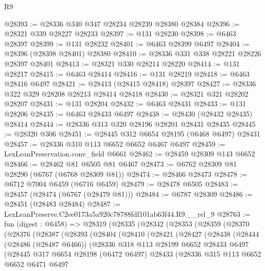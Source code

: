 \begin{lexlean}{R9}
\begin{coremodule}
@28393 := @28336 @340 @347 @28234 @28239 @28380 @28384
@28396 := @28321 @339 @28227 @28233
@28397 := @131 @28230
@28398 := @6463 @28397
@28399 := @131 @28232
@28401 := @6463 @28399 @6497
@28404 := @28396 (@28398 @28401) @28380
@28410 := @28336 @331 @338 @28221 @28226 @28397 @28401
@28413 := @28321 @330 @28214 @28220
@28414 := @131 @28217
@28415 := @6463 @28414
@28416 := @131 @28219
@28418 := @6463 @28416 @6497
@28421 := @28413 (@28415 @28418) @28397
@28427 := @28336 @322 @329 @28208 @28213 @28414 @28418
@28430 := @28321 @321 @28202 @28207
@28431 := @131 @28204
@28432 := @6463 @28431
@28433 := @131 @28206
@28435 := @6463 @28433 @6497
@28438 := @28430 (@28432 @28435) @28414
@28444 := @28336 @313 @320 @28196 @28201 @28431 @28435
@28445 := @28320 @306
@28451 := @28445 @312 @6654 @28195 (@6468 @6497) @28431
@28457 := @28336 @310 @113 @6652 @6652 @6467 @6497
@28459 := LexLeanPreservation.conv_field @6661
@28462 := @28459 @28309 @143 @6652
@28466 := @28462 @81 @6505 @81 @6467
@28473 := @6762 @28309 @81 @28290 (@6767 (@6768 @28309 @81))
@28474 := @28466 @28473
@28478 := @6712 @7004 @6459 (@6716 @6459)
@28479 := @28478 @6505
@28483 := @28457 (@28474 (@6767 (@28479 @81)))
@28484 := @6787 @28309
@28486 := @28451 (@28483 @28484)
@28487 := LexLeanPreserve.C2ee0173a5a920c78788fdf101ab63f44.R9.__rel_9
@28763 := fun (digest : @6458) =>
  @28319
    (@28335
      (@28342
        (@28353
          (@28359
            (@28370
              (@28376
                (@28387
                  (@28393
                    (@28404
                      (@28410
                        (@28421
                          (@28427
                            (@28438
                              (@28444
                                (@28486 (@28487 @6466))
                                (@28336
                                  @318
                                  @113
                                  @28199
                                  @6652
                                  @28433
                                  @6497
                                  (@28445
                                    @317
                                    @6654
                                    @28198
                                    (@6472 @6497)
                                    @28433
                                    (@28336
                                      @315
                                      @113
                                      @6652
                                      @6652
                                      @6471
                                      @6497

\end{coremodule}
\end{lexlean}
